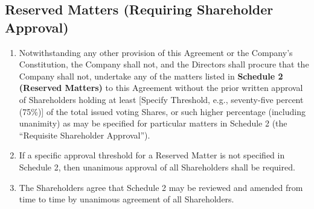 \subsection{Reserved Matters (Requiring Shareholder Approval)}
\begin{enumerate}[label=(\alph*), wide, labelwidth=!, labelindent=0pt]
\item Notwithstanding any other provision of this Agreement or the Company's Constitution, the Company shall not, and the Directors shall procure that the Company shall not, undertake any of the matters listed in \textbf{Schedule 2 (Reserved Matters)} to this Agreement without the prior written approval of Shareholders holding at least [Specify Threshold, e.g., seventy-five percent (75\%)] of the total issued voting Shares, or such higher percentage (including unanimity) as may be specified for particular matters in Schedule 2 (the ``Requisite Shareholder Approval'').
\item If a specific approval threshold for a Reserved Matter is not specified in Schedule 2, then unanimous approval of all Shareholders shall be required.
\item The Shareholders agree that Schedule 2 may be reviewed and amended from time to time by unanimous agreement of all Shareholders.
\end{enumerate}


